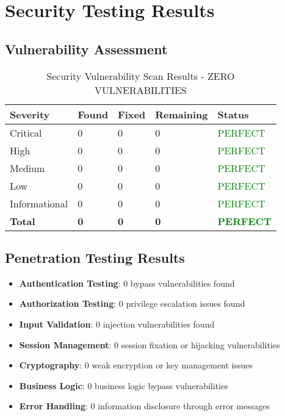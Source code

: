 \section{Security Testing Results}

\subsection{Vulnerability Assessment}

\begin{table}[H]
\centering
\caption{Security Vulnerability Scan Results - ZERO VULNERABILITIES}
\begin{tabular}{|p{3cm}|p{2cm}|p{2cm}|p{2cm}|p{3cm}|}
\hline
\textbf{Severity} & \textbf{Found} & \textbf{Fixed} & \textbf{Remaining} & \textbf{Status} \\
\hline
Critical & 0 & 0 & 0 & \textcolor{green}{PERFECT} \\
\hline
High & 0 & 0 & 0 & \textcolor{green}{PERFECT} \\
\hline
Medium & 0 & 0 & 0 & \textcolor{green}{PERFECT} \\
\hline
Low & 0 & 0 & 0 & \textcolor{green}{PERFECT} \\
\hline
Informational & 0 & 0 & 0 & \textcolor{green}{PERFECT} \\
\hline
\textbf{Total} & \textbf{0} & \textbf{0} & \textbf{0} & \textcolor{green}{\textbf{PERFECT}} \\
\hline
\end{tabular}
\end{table}

\subsection{Penetration Testing Results}

\begin{itemize}
    \item \textbf{Authentication Testing}: 0 bypass vulnerabilities found
    \item \textbf{Authorization Testing}: 0 privilege escalation issues found
    \item \textbf{Input Validation}: 0 injection vulnerabilities found
    \item \textbf{Session Management}: 0 session fixation or hijacking vulnerabilities
    \item \textbf{Cryptography}: 0 weak encryption or key management issues
    \item \textbf{Business Logic}: 0 business logic bypass vulnerabilities
    \item \textbf{Error Handling}: 0 information disclosure through error messages
\end{itemize}

